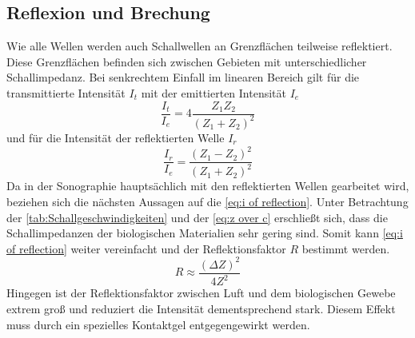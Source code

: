 \subsection{Reflexion und Brechung}\label{sec:schall_reflection}
Wie alle Wellen werden auch Schallwellen an Grenzflächen teilweise reflektiert. Diese Grenzflächen befinden sich zwischen Gebieten mit unterschiedlicher Schallimpedanz.
Bei senkrechtem Einfall im linearen Bereich gilt für die transmittierte Intensität $I_t$ mit der emittierten Intensität $I_e$
\begin{equation}
\frac{I_t}{I_e}=4\dfrac{Z_1Z_2}{(Z_1+Z_2)^2}
\end{equation}
und für die Intensität der reflektierten Welle $I_r$
\begin{equation}
\frac{I_r}{I_e}=\dfrac{(Z_1-Z_2)^2}{(Z_1+Z_2)^2}
\label{eq:i of reflection}
\end{equation}
Da in der Sonographie hauptsächlich mit den reflektierten Wellen gearbeitet wird, beziehen sich die nächsten Aussagen auf die \autoref{eq:i of reflection}. Unter Betrachtung der \autoref{tab:Schallgeschwindigkeiten}  und der \autoref{eq:z over c} erschließt sich, dass die Schallimpedanzen der biologischen Materialien sehr gering sind. Somit kann \autoref{eq:i of reflection} weiter vereinfacht und der Reflektionsfaktor $R$ bestimmt werden.
\begin{equation}
R\approx \dfrac{\left(\Delta Z\right)^2}{4Z^2}
\end{equation}
Hingegen ist der Reflektionsfaktor zwischen Luft und dem biologischen Gewebe extrem groß und reduziert die Intensität dementsprechend stark. Diesem Effekt muss durch ein spezielles Kontaktgel entgegengewirkt werden.
%
\cite{suter2006}\cite{suter2009}\cite{suter2010}
%
